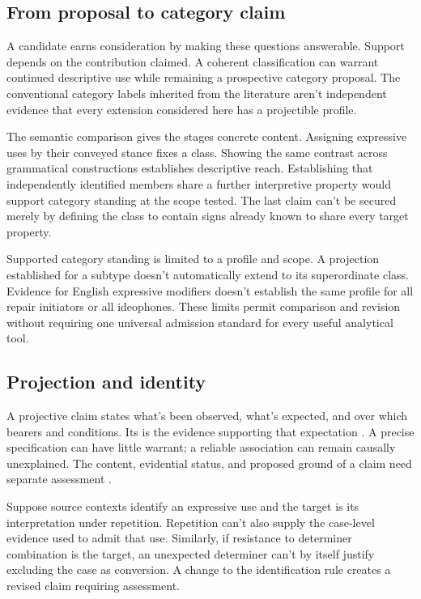 \documentclass[12pt]{article}
\begin{document}
\subsection{From proposal to category claim}

A candidate earns consideration by making these questions answerable.
Support depends on the contribution claimed. A coherent classification
can warrant continued descriptive use while remaining a prospective
category proposal. The conventional category labels inherited from the
literature aren't independent evidence that every extension considered
here has a projectible profile.

The semantic comparison gives the stages concrete content. Assigning
expressive uses by their conveyed stance fixes a class. Showing the
same contrast across grammatical constructions establishes descriptive
reach. Establishing that independently identified members share a
further interpretive property would support category standing at the
scope tested. The last claim can't be secured merely by defining the
class to contain signs already known to share every target property.

Supported category standing is limited to a profile and
scope. A projection established for a subtype doesn't automatically
extend to its superordinate class. Evidence for English expressive
modifiers doesn't establish the same profile for all repair initiators
or all ideophones. These limits permit comparison and revision without
requiring one universal admission standard for every useful analytical
tool.

\subsection{Projection and identity}

A projective claim states what's been observed, what's expected, and
over which bearers and conditions. Its  is the evidence
supporting that expectation \citep{Goodman1955}. A precise specification
can have little warrant; a reliable association can remain causally
unexplained. The content, evidential status, and proposed ground of a
claim need separate assessment
\citep[11--12]{reynolds2026projectibilityHistory}.

Suppose source contexts identify an expressive use and the target is
its interpretation under repetition. Repetition can't also supply the
case-level evidence used to admit that use. Similarly, if resistance
to determiner combination is the target, an unexpected determiner
can't by itself justify excluding the case as conversion. A change
to the identification rule creates a revised claim requiring assessment.
\end{document}

